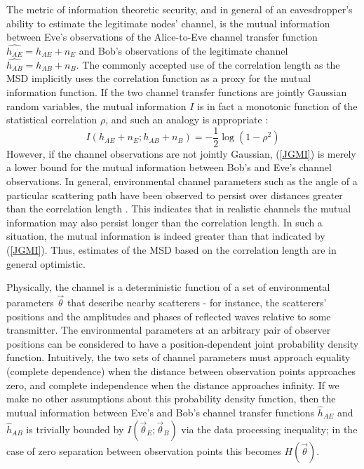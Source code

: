 \documentclass[journal]{IEEEtran}
\begin{document}
The metric of information theoretic security, and in general of an eavesdropper's ability to estimate the legitimate nodes' channel, is the mutual information between Eve's observations of the Alice-to-Eve channel transfer function $\hat{h_{AE}}=h_{AE}+n_E$ and Bob's observations of the legitimate channel $\hat{h_{AB}}=h_{AB}+n_B$. The commonly accepted use of the correlation length as the MSD implicitly uses the correlation function as a proxy for the mutual information function.  If the two channel transfer functions are jointly Gaussian random variables, the mutual information $I$ is in fact a monotonic function of the statistical correlation $\rho$, and such an analogy is appropriate \cite{cover2006-jgvars}:
\begin{equation}\label{JGMI}
I(h_{AE}+n_E;h_{AB}+n_B) = -\frac{1}{2}\log (1-\rho^2)
\end{equation}
However, if the channel observations are not jointly Gaussian, (\ref{JGMI}) is merely a lower bound for the mutual information between Bob's and Eve's channel observations.  In general, environmental channel parameters such as the angle of a particular scattering path have been observed to persist over distances greater than the correlation length \cite{jakes1974, duel-hallen2007}.  
This indicates that in realistic channels the mutual information may also persist longer than the correlation length. In such a situation, the mutual information is indeed greater than that indicated by (\ref{JGMI}).  Thus, estimates of the MSD based on the correlation length are in general optimistic.



Physically, the channel is a deterministic function of a set of environmental parameters $\vec{\theta}$ that describe nearby scatterers - for instance, the scatterers' positions and the amplitudes and phases of reflected waves relative to some transmitter.  The environmental parameters at an arbitrary pair of observer positions can be considered to have a position-dependent joint probability density function.  Intuitively, the two sets of channel parameters must approach equality (complete dependence) when the distance between observation points approaches zero, and complete independence when the distance approaches infinity.  
If we make no other assumptions about this probability density function, then the mutual information between Eve's and Bob's channel transfer functions $\hat{h}_{AE}$ and $\hat{h}_{AB}$ is trivially bounded by $I(\vec{\theta}_E;\vec{\theta}_B)$ via the data processing inequality; in the case of zero separation between observation points this becomes $H(\vec{\theta})$.
\end{document}
